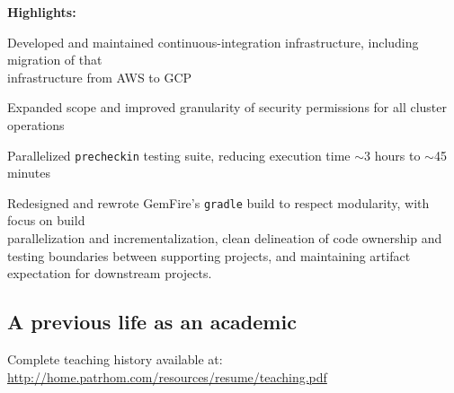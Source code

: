 \documentclass[10pt,letterpaper]{article}
\newcommand\ttt\texttt
\renewenvironment{itemize}{
  \begin{list}{}{
    \setlength{\leftmargin}{1.5em}
    \setlength{\itemsep}{0.25em}
    \setlength{\parskip}{0pt}
    \setlength{\parsep}{0.25em}
  }
}{
  \end{list}
}
\begin{document}
\begin{itemize}
  \item
  \begin{itemize}
  \vspace{.5em}
  \item {\textbf{Highlights:}}
  \item\quad Developed and maintained continuous-integration infrastructure,
    including migration of that \\ infrastructure from AWS to GCP
  \item\quad Expanded scope and improved granularity of security permissions for all cluster operations
  \item\quad Parallelized \verb!precheckin! testing suite, reducing execution time $\sim$3 hours to $\sim$45 minutes
  \item\quad Redesigned and rewrote GemFire's \ttt{gradle} build to respect modularity,
    with focus on build\\ parallelization and incrementalization,
    clean delineation of code ownership and testing boundaries between supporting projects,
    and maintaining artifact expectation for downstream projects.
  \end{itemize}
\end{itemize}

\subsection*{A previous life as an academic}
\begin{itemize}
  \item

  \item

  \item

  \item

  \item Complete teaching history available at: \url{http://home.patrhom.com/resources/resume/teaching.pdf}
\end{itemize}
\end{document}
